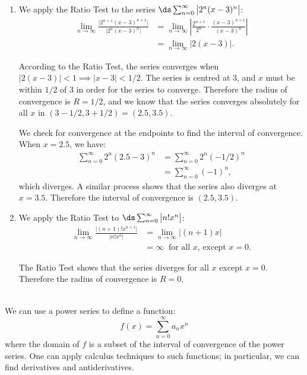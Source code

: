 {\begin{enumerate}
	When $x=1$, we have the series $\ds \sum_{n=1}^\infty (-1)^{n+1}\frac{(1)^n}{n}$, which is the Alternating Harmonic Series, which converges. Therefore the interval of convergence is $(-1,1]$.
	
	\item		We apply the Ratio Test to the series $\ds\sum_{n=0}^\infty \big|2^n(x-3)^n\big|$:
	\begin{align*}
	\lim_{n\to\infty} \frac{\big| 2^{n+1}(x-3)^{n+1}\big|}{\big|2^n(x-3)^n\big|} &= \lim_{n\to\infty} \left|\frac{2^{n+1}}{2^n}\cdot\frac{(x-3)^{n+1}}{(x-3)^n}\right|\\
			&=\lim_{n\to\infty} \big|2(x-3)\big|.
	\end{align*}
	
According to the Ratio Test, the series converges when $\big|2(x-3)\big|<1 \implies \big|x-3\big| < 1/2$. The series is centred at 3, and $x$ must be within $1/2$ of 3 in order for the series to converge. Therefore the radius of convergence is $R=1/2$, and we know that the series converges absolutely for all $x$ in $(3-1/2,3+1/2) = (2.5, 3.5)$.

We check for convergence at the endpoints to find the interval of convergence. When $x=2.5$, we have:
\begin{align*}
\sum_{n=0}^\infty 2^n(2.5-3)^n &= \sum_{n=0}^\infty 2^n(-1/2)^n \\
			&=\sum_{n=0}^\infty (-1)^n,
\end{align*}
which diverges. A similar process shows that the series also diverges at $x=3.5$. Therefore the interval of convergence is $(2.5, 3.5)$.

\item		We apply the Ratio Test to $\ds \sum_{n=0}^\infty \big|n!x^n\big|$:
\begin{align*}
\lim_{n\to\infty} \frac{\big| (n+1)!x^{n+1}\big|}{\big|n!x^n\big|} &= \lim_{n\to\infty} \big|(n+1)x\big|\\
		&= \infty\ \text{ for all $x$, except $x=0$.}
\end{align*}

The Ratio Test shows that the series diverges for all $x$ except $x=0$. Therefore the radius of convergence is $R=0$.
\end{enumerate}
\baselineskip
}\\

We can use a power series to define a function:
$$f(x) = \sum_{n=0}^\infty a_nx^n$$
where the domain of $f$ is a subset of the interval of convergence of the power series. One can apply calculus techniques to such functions; in particular, we can find derivatives and antiderivatives. 

